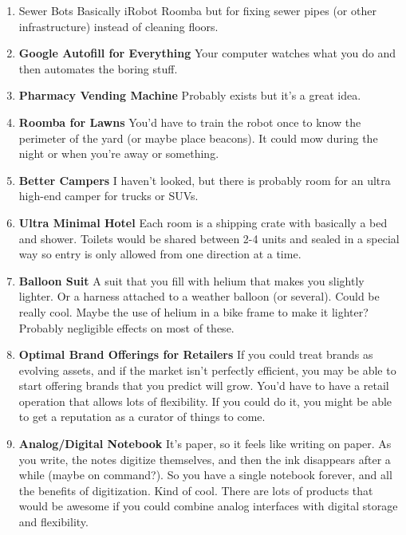 \documentclass[paper=a4, fontsize=11pt]{scrartcl} %
\numberwithin{equation}{section} %
\numberwithin{figure}{section} %
\numberwithin{table}{section} %
\begin{document}
\begin{enumerate}
\item{Sewer Bots} Basically iRobot Roomba but for fixing sewer pipes (or other infrastructure) instead of cleaning floors.

\item \textbf{Google Autofill for Everything} Your computer watches what you do and then automates the boring stuff.

\item \textbf{Pharmacy Vending Machine} Probably exists but it's a great idea.

\item \textbf{Roomba for Lawns} You'd have to train the robot once to know the perimeter of the yard (or maybe place beacons).  It could mow during the night or when you're away or something.

\item \textbf{Better Campers} I haven't looked, but there is probably room for an ultra high-end camper for trucks or SUVs.

\item \textbf{Ultra Minimal Hotel} Each room is a shipping crate with basically a bed and shower.  Toilets would be shared between 2-4 units and sealed in a  special way so entry is only allowed from one direction at a time.

\item \textbf{Balloon Suit} A suit that you fill with helium that makes you slightly lighter.  Or a harness attached to a weather balloon (or several).  Could be really cool.  Maybe the use of helium in a bike frame to make it lighter?  Probably negligible effects on most of these.  

\item \textbf{Optimal Brand Offerings for Retailers} If you could treat brands as evolving assets, and if the market isn't perfectly efficient, you may be able to start offering brands that you predict will grow.  You'd have to have a retail operation that allows lots of flexibility.  If you could do it, you might be able to get a reputation as a curator of things to come.

\item \textbf{Analog/Digital Notebook} It's paper, so it feels like writing on paper.  As you write, the notes digitize themselves, and then the ink disappears after a while (maybe on command?).  So you have a single notebook forever, and all the benefits of digitization.  Kind of cool.  There are lots of products that would be awesome if you could combine analog interfaces with digital storage and flexibility.  


\end{enumerate}
\end{document}
